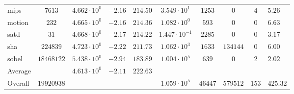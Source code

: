 \begin{tabular}{|l|c|HHc|c|c|c|cH|}
mips          & $ 7613     $ & $ 4.662 \cdot 10^{0} $ & $ -2.16 $ & $ 214.50 $ & $ 3.549 \cdot 10^{1}  $ & $ 1253  $ & $ 0      $ & $ 4   $ & $ 5.26    $ \\
motion        & $ 232      $ & $ 4.665 \cdot 10^{0} $ & $ -2.16 $ & $ 214.36 $ & $ 1.082 \cdot 10^{0}  $ & $ 593   $ & $ 0      $ & $ 0   $ & $ 6.63    $ \\
satd          & $ 31       $ & $ 4.668 \cdot 10^{0} $ & $ -2.17 $ & $ 214.22 $ & $ 1.447 \cdot 10^{-1} $ & $ 2285  $ & $ 0      $ & $ 0   $ & $ 3.17    $ \\
sha           & $ 224839   $ & $ 4.723 \cdot 10^{0} $ & $ -2.22 $ & $ 211.73 $ & $ 1.062 \cdot 10^{3}  $ & $ 1633  $ & $ 134144 $ & $ 0   $ & $ 6.00    $ \\
sobel         & $ 18468122 $ & $ 5.438 \cdot 10^{0} $ & $ -2.94 $ & $ 183.89 $ & $ 1.004 \cdot 10^{5}  $ & $ 639   $ & $ 0      $ & $ 2   $ & $ 2.02    $ \\
\hline
Average       & $          $ & $ 4.613 \cdot 10^{0} $ & $ -2.11 $ & $ 222.63 $ & $                     $ & $       $ & $        $ & $     $ & $         $ \\
\hline
Overall       & $ 19920938 $ & $                    $ & $       $ & $        $ & $ 1.059 \cdot 10^{5}  $ & $ 46447 $ & $ 579512 $ & $ 153 $ & $ 425.32  $ \\
\hline
\end{tabular}
